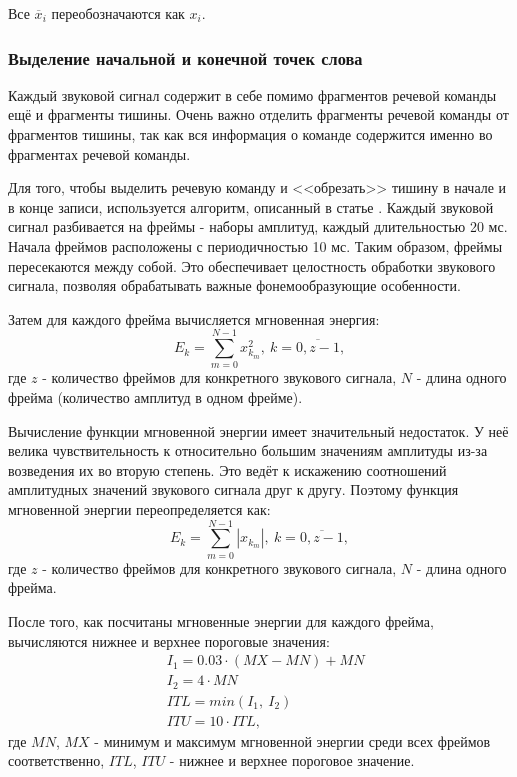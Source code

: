 Все $\overline{x}_i$ переобозначаются как $x_i$.

\subsubsection{Выделение начальной и конечной точек слова}
Каждый звуковой сигнал содержит в себе помимо фрагментов речевой команды ещё и фрагменты тишины. Очень важно отделить фрагменты речевой команды от фрагментов тишины, так как вся информация о команде содержится именно во фрагментах речевой команды.

Для того, чтобы выделить речевую команду и <<обрезать>> тишину в начале и в конце записи, используется алгоритм, описанный в статье \cite{SignalPreprocessing}. 
Каждый звуковой сигнал разбивается на фреймы - наборы амплитуд, каждый длительностью 20 мс. Начала фреймов расположены с периодичностью 10 мс. Таким образом, фреймы пересекаются между собой. Это обеспечивает целостность обработки звукового сигнала, позволяя обрабатывать важные фонемообразующие особенности.

Затем для каждого фрейма вычисляется мгновенная энергия:
\begin{equation}
E_k = \sum_{m=0}^{N-1} x_{k_m}^2,~k=\overline{0,z-1},
\end{equation}
где $z$ - количество фреймов для конкретного звукового сигнала, $N$ - длина одного фрейма (количество амплитуд в одном фрейме).

Вычисление функции мгновенной энергии имеет значительный недостаток. У неё велика чувствительность к относительно большим значениям амплитуды из-за возведения их во вторую степень. Это ведёт к искажению соотношений амплитудных значений звукового сигнала друг к другу. Поэтому функция мгновенной энергии переопределяется как:
\begin{equation}
\label{eq:instant_energy}
E_k = \sum_{m=0}^{N-1} |x_{k_m}|,~k=\overline{0,z-1},
\end{equation}
где $z$ - количество фреймов для конкретного звукового сигнала, $N$ - длина одного фрейма.

После того, как посчитаны мгновенные энергии для каждого фрейма, вычисляются нижнее и верхнее пороговые значения:
\begin{equation}
\begin{aligned}
& I_1 = 0.03 \cdot (MX - MN) + MN \\
& I_2 = 4 \cdot MN \\
& ITL = min(I_1,~I_2)\\
& ITU = 10 \cdot ITL,
\end{aligned}
\end{equation}
где $MN$, $MX$ - минимум и максимум мгновенной энергии среди всех фреймов соответственно, $ITL$, $ITU$ - нижнее и верхнее пороговое значение.

